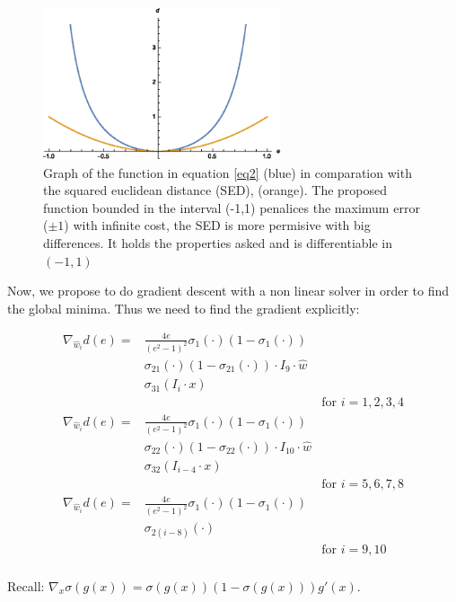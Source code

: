 \documentclass[a4paper,10pt,twocolumn]{article}
\begin{document}
\begin{figure}[!ht]
\begin{center}
\includegraphics[width=7cm]{d.eps}
\caption{Graph of the function in equation \ref{eq2} (blue) in comparation with the squared euclidean distance (SED), (orange). The proposed function bounded in the interval (-1,1) penalices the maximum error ($\pm 1$) with infinite cost, the SED is more permisive with big differences. It holds the properties asked and is differentiable in $(-1,1)$ }
\end{center}
\end{figure}

Now, we propose to do gradient descent with a non linear solver in order to find the global minima. Thus we need to find the gradient explicitly:

\begin{equation}
\begin{aligned} \label{gradient}
\nabla_{\hat{w}_i}d(e) =& \frac{4 e}{(e^2-1)^2}\sigma_1(\cdot)(1-\sigma_1(\cdot))\\
&\sigma_{21}(\cdot)(1-\sigma_{21}(\cdot))\cdot I_9 \cdot \hat{w} \\
&\sigma_{31}(I_i\cdot x) \\ &&\text{for  } i=1,2,3,4\\
\nabla_{\hat{w}_i}d(e) =& \frac{4 e}{(e^2-1)^2}\sigma_1(\cdot)(1-\sigma_1(\cdot))\\
&\sigma_{22}(\cdot)(1-\sigma_{22}(\cdot))\cdot I_{10} \cdot \hat{w} \\
&\sigma_{32}(I_{i-4}\cdot x) \\ &&\text{for  } i=5,6,7,8\\
\nabla_{\hat{w}_i}d(e) =& \frac{4 e}{(e^2-1)^2}\sigma_1(\cdot)(1-\sigma_1(\cdot))\\
&\sigma_{2(i-8)}(\cdot)\\ &&\text{for  } i=9,10\\
\end{aligned}
\end{equation}

Recall: $\nabla_x \sigma(g(x)) = \sigma(g(x))(1-\sigma(g(x)))g'(x)$.
\end{document}
